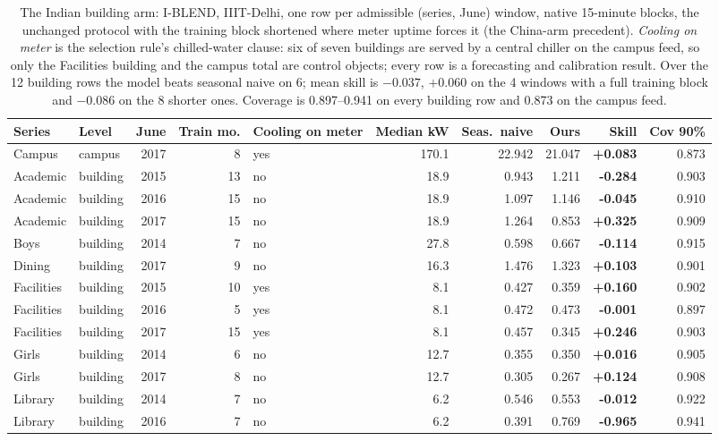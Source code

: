 \begin{table}[t]
\centering
\scriptsize
\setlength{\tabcolsep}{3pt}
\begin{tabular}{llrrlrrrrr}
\toprule
Series & Level & June & Train mo. & Cooling on meter & Median kW & Seas.\ naive & Ours & Skill & Cov 90\% \\
\midrule
Campus & campus & 2017 & 8 & yes & 170.1 & 22.942 & 21.047 & \textbf{+0.083} & 0.873 \\
Academic & building & 2015 & 13 & no & 18.9 & 0.943 & 1.211 & \textbf{-0.284} & 0.903 \\
Academic & building & 2016 & 15 & no & 18.9 & 1.097 & 1.146 & \textbf{-0.045} & 0.910 \\
Academic & building & 2017 & 15 & no & 18.9 & 1.264 & 0.853 & \textbf{+0.325} & 0.909 \\
Boys & building & 2014 & 7 & no & 27.8 & 0.598 & 0.667 & \textbf{-0.114} & 0.915 \\
Dining & building & 2017 & 9 & no & 16.3 & 1.476 & 1.323 & \textbf{+0.103} & 0.901 \\
Facilities & building & 2015 & 10 & yes & 8.1 & 0.427 & 0.359 & \textbf{+0.160} & 0.902 \\
Facilities & building & 2016 & 5 & yes & 8.1 & 0.472 & 0.473 & \textbf{-0.001} & 0.897 \\
Facilities & building & 2017 & 15 & yes & 8.1 & 0.457 & 0.345 & \textbf{+0.246} & 0.903 \\
Girls & building & 2014 & 6 & no & 12.7 & 0.355 & 0.350 & \textbf{+0.016} & 0.905 \\
Girls & building & 2017 & 8 & no & 12.7 & 0.305 & 0.267 & \textbf{+0.124} & 0.908 \\
Library & building & 2014 & 7 & no & 6.2 & 0.546 & 0.553 & \textbf{-0.012} & 0.922 \\
Library & building & 2016 & 7 & no & 6.2 & 0.391 & 0.769 & \textbf{-0.965} & 0.941 \\
\bottomrule
\end{tabular}
\caption{The Indian building arm: I-BLEND, IIIT-Delhi, one row per admissible (series, June) window, native 15-minute blocks, the unchanged protocol with the training block shortened where meter uptime forces it (the China-arm precedent). \emph{Cooling on meter} is the selection rule's chilled-water clause: six of seven buildings are served by a central chiller on the campus feed, so only the Facilities building and the campus total are control objects; every row is a forecasting and calibration result. Over the 12 building rows the model beats seasonal naive on 6; mean skill is $-0.037$, $+0.060$ on the 4 windows with a full training block and $-0.086$ on the 8 shorter ones. Coverage is 0.897--0.941 on every building row and 0.873 on the campus feed.}
\label{tab:iblend}
\end{table}
